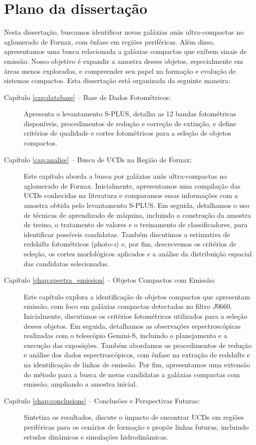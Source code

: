 \section{Plano da dissertação}\label{sec:plano_dissertacao}\label{sec:plano_dissertacao}
Nesta dissertação, buscamos identificar novas galáxias anãs ultra-compactas no aglomerado de Fornax, com ênfase em regiões periféricas. Além disso, apresentamos uma busca relacionada a galáxias compactas que exibem sinais de emissão. Nosso objetivo é expandir a amostra desses objetos, especialmente em áreas menos exploradas, e compreender seu papel na formação e evolução de sistemas compactos. Esta dissertação está organizada da seguinte maneira:

\begin{description}
\item[Capítulo \ref{cap:database} – Base de Dados Fotométricos:] Apresenta o levantamento S-PLUS, detalha as 12 bandas fotométricas disponíveis, procedimentos de redução e correção de extinção, e define critérios de qualidade e cortes fotométricos para a seleção de objetos compactos.

\item[Capítulo \ref{cap:analise} – Busca de UCDs na Região de Fornax:] Este capítulo aborda a busca por galáxias anãs ultra-compactas no aglomerado de Fornax. Inicialmente, apresentamos uma compilação das UCDs conhecidas na literatura e comparamos essas informações com a amostra obtida pelo levantamento S-PLUS. Em seguida, detalhamos o uso de técnicas de aprendizado de máquina, incluindo a construção da amostra de treino, o tratamento de valores e o treinamento de classificadores, para identificar possíveis candidatas. Também discutimos a estimativa de redshifts fotométricos (photo-\textit{z}) e, por fim, descrevemos os critérios de seleção, os cortes morfológicos aplicados e a análise da distribuição espacial das candidatas selecionadas.

\item[Capítulo \ref{chap:spectra_emission} – Objetos Compactos com Emissão:] Este capítulo explora a identificação de objetos compactos que apresentam emissão, com foco em galáxias compactas detectadas no filtro $J0660$. Inicialmente, discutimos os critérios fotométricos utilizados para a seleção desses objetos. Em seguida, detalhamos as observações espectroscópicas realizadas com o telescópio Gemini-S, incluindo o planejamento e a execução das exposições. Também abordamos os procedimentos de redução e análise dos dados espectroscópicos, com ênfase na extração de redshifts e na identificação de linhas de emissão. Por fim, apresentamos uma extensão do método para a busca de novas candidatas a galáxias compactas com emissão, ampliando a amostra inicial.

\item[Capítulo \ref{chap:conclusions} – Conclusões e Perspectivas Futuras:] Sintetiza os resultados, discute o impacto de encontrar UCDs em regiões periféricas para os cenários de formação e propõe linhas futuras, incluindo estudos dinâmicos e simulações hidrodinâmicas.

\end{description}
